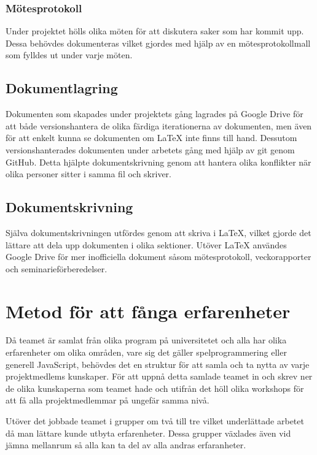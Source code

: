 \subsubsection*{Mötesprotokoll}
Under projektet hölls olika möten för att diskutera saker som har kommit upp. Dessa behövdes dokumenteras vilket gjordes med hjälp av en mötesprotokollmall som fylldes ut under varje möten.

\subsection{Dokumentlagring}
Dokumenten som skapades under projektets gång lagrades på Google Drive för att både versionshantera de olika färdiga iterationerna av dokumenten, men även för att enkelt kunna se dokumenten om LaTeX inte finns till hand. Dessutom versionshanterades dokumenten under arbetets gång med hjälp av git genom GitHub. Detta hjälpte dokumentskrivning genom att hantera olika konflikter när olika personer sitter i samma fil och skriver.

\subsection{Dokumentskrivning}
Själva dokumentskrivningen utfördes genom att skriva i LaTeX, vilket gjorde det lättare att dela upp dokumenten i olika sektioner. Utöver LaTeX användes Google Drive för mer inofficiella dokument såsom mötesprotokoll, veckorapporter och seminarieförberedelser.

\section{Metod för att fånga erfarenheter}
Då teamet är samlat från olika program på universitetet och alla har olika erfarenheter om olika områden, vare sig det gäller spelprogrammering eller generell JavaScript, behövdes det en struktur för att samla och ta nytta av varje projektmedlems kunskaper. För att uppnå detta samlade teamet in och skrev ner de olika kunskaperna som teamet hade och utifrån det höll olika workshops för att få alla projektmedlemmar på ungefär samma nivå.

Utöver det jobbade teamet i grupper om två till tre vilket underlättade arbetet då man lättare kunde utbyta erfarenheter. Dessa grupper växlades även vid jämna mellanrum så alla kan ta del av alla andras erfaranheter.
